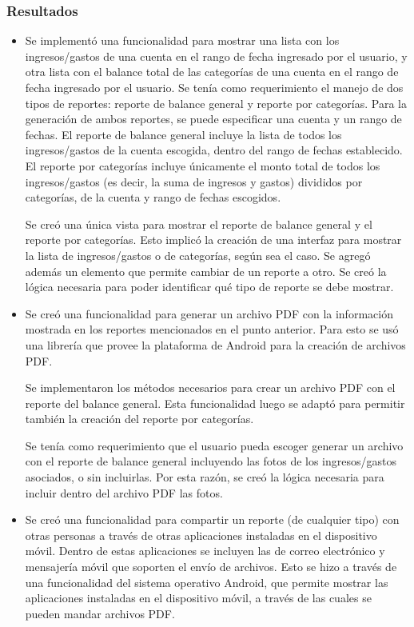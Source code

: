 \subsubsection{Resultados}
\begin{itemize}
\item Se implementó una funcionalidad para mostrar una lista con los ingresos/gastos de una cuenta en el rango de fecha ingresado por el usuario, y otra lista con el balance total de las categorías de una cuenta en el rango de fecha ingresado por el usuario. Se tenía como requerimiento el manejo de dos tipos de reportes: reporte de balance general y reporte por categorías. Para la generación de ambos reportes, se puede especificar una cuenta y un rango de fechas. El reporte de balance general incluye la lista de todos los ingresos/gastos de la cuenta escogida, dentro del rango de fechas establecido. El reporte por categorías incluye únicamente el monto total de todos los ingresos/gastos (es decir, la suma de ingresos y gastos) divididos por categorías, de la cuenta y rango de fechas escogidos.

Se creó una única vista para mostrar el reporte de balance general y el reporte por categorías. Esto implicó la creación de una interfaz para mostrar la lista de ingresos/gastos o de categorías, según sea el caso. Se agregó además un elemento que permite cambiar de un reporte a otro. Se creó la lógica necesaria para poder identificar qué tipo de reporte se debe mostrar.
\item Se creó una funcionalidad para generar un archivo PDF con la información mostrada en los reportes mencionados en el punto anterior.  Para esto se usó una librería que provee la plataforma de Android para la creación de archivos PDF.  

Se implementaron los métodos necesarios para crear un archivo PDF con el reporte del balance general. Esta funcionalidad luego se adaptó para permitir también la creación del reporte por categorías. %

Se tenía como requerimiento que el usuario pueda escoger generar un archivo con el reporte de balance general incluyendo las fotos de los ingresos/gastos asociados, o sin incluirlas. Por esta razón, se creó la lógica necesaria para incluir dentro del archivo PDF las fotos.
\item Se creó una funcionalidad para compartir un reporte (de cualquier tipo) con otras personas a través de otras aplicaciones instaladas en el dispositivo móvil. Dentro de estas aplicaciones se incluyen las de correo electrónico y mensajería móvil que soporten el envío de archivos. Esto se hizo a través de una funcionalidad del sistema operativo Android, que permite mostrar las aplicaciones instaladas en el dispositivo móvil, a través de las cuales se pueden mandar archivos PDF.
\end{itemize}
